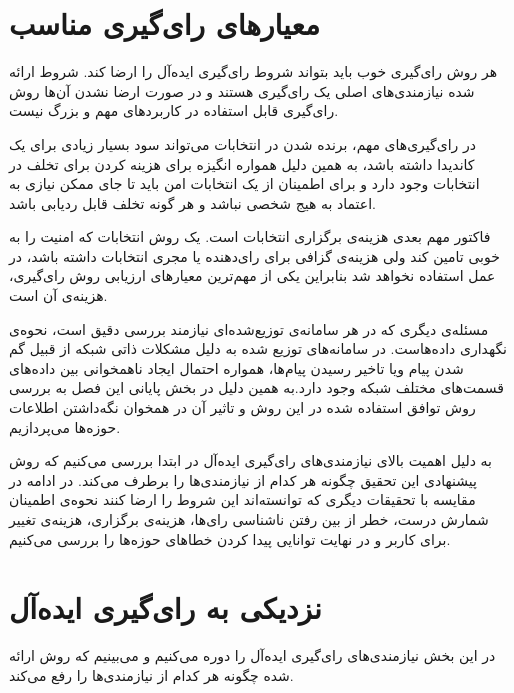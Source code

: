 \section{معیار‌های رای‌گیری مناسب}
هر روش رای‌گیری خوب باید بتواند شروط رای‌گیری ایده‌آل را ارضا کند. شروط ارائه شده نیازمندی‌های اصلی یک رای‌گیری هستند و در صورت ارضا نشدن آن‌ها روش رای‌گیری قابل استفاده در کاربرد‌های مهم و بزرگ نیست. 
\par 
در رای‌گیری‌های مهم، برنده شدن در انتخابات می‌تواند سود بسیار زیادی برای یک کاندیدا داشته باشد، به همین دلیل همواره انگیزه برای هزینه کردن برای تخلف در انتخابات وجود دارد و برای اطمینان از یک انتخابات امن باید تا جای ممکن نیازی به اعتماد به هیج شخصی نباشد و هر گونه تخلف قابل ردیابی باشد. 
\par 
فاکتور مهم بعدی هزینه‌ی برگزاری انتخابات است. یک روش انتخابات که امنیت را به خوبی تامین کند ولی هزینه‌ی گزافی برای رای‌دهنده یا مجری انتخابات داشته باشد، در عمل استفاده نخواهد شد بنابراین یکی از مهم‌ترین معیارهای ارزیابی روش رای‌گیری، هزینه‌ی آن است. 
\par 
مسئله‌ی دیگری که در هر سامانه‌ی توزیع‌شده‌ای نیازمند بررسی دقیق است، نحوه‌ی نگهداری داده‌هاست. در سامانه‌های توزیع شده به دلیل مشکلات ذاتی شبکه از قبیل گم شدن پیام ویا تاخیر رسیدن پیام‌ها، همواره احتمال ایجاد ناهمخوانی بین داده‌های قسمت‌های مختلف شبکه وجود دارد.به همین دلیل در بخش پایانی این فصل به بررسی روش توافق استفاده شده در این روش و تاثیر آن در همخوان نگه‌داشتن اطلاعات حوزه‌ها می‌پردازیم. 
\par
به دلیل اهمیت بالای نیازمندی‌های رای‌گیری ایده‌آل در ابتدا بررسی می‌کنیم که روش پیشنهادی این تحقیق چگونه هر کدام از نیازمندی‌ها را برطرف می‌کند. در ادامه در مقایسه با تحقیقات دیگری که توانسته‌اند این شروط را ارضا کنند نحوه‌ی اطمینان شمارش درست، خطر از بین رفتن ناشناسی رای‌ها، هزینه‌ی برگزاری، هزینه‌ی تغییر برای کاربر و در نهایت توانایی پیدا کردن خطاهای حوزه‌ها را بررسی می‌کنیم.
\section{نزدیکی به رای‌گیری ایده‌آل}
در این بخش نیازمندی‌های رای‌گیری ایده‌آل را دوره می‌کنیم و می‌بینیم که روش ارائه شده چگونه هر کدام از نیاز‌مندی‌ها را رفع می‌کند.


